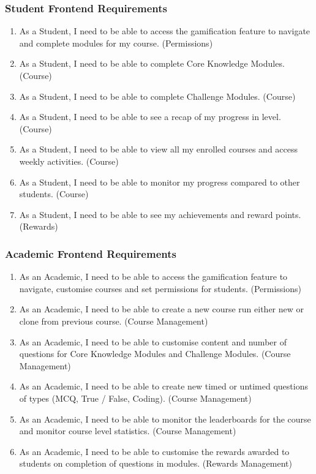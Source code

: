 \subsubsection{Student Frontend Requirements}
\begin{enumerate}
    \item As a Student, I need to be able to access the gamification feature to navigate and complete modules for my course. (Permissions)
    \item As a Student, I need to be able to complete Core Knowledge Modules. (Course)
    \item As a Student, I need to be able to complete Challenge Modules. (Course)
    \item As a Student, I need to be able to see a recap of my progress in level. (Course)
    \item As a Student, I need to be able to view all my enrolled courses and access weekly activities. (Course)
    \item As a Student, I need to be able to monitor my progress compared to other students. (Course)
    \item As a Student, I need to be able to see my achievements and reward points. (Rewards)
\end{enumerate}

\subsubsection{Academic Frontend Requirements}
\begin{enumerate}
    \item As an Academic, I need to be able to access the gamification feature to navigate, customise courses and set permissions for students. (Permissions)
    \item As an Academic, I need to be able to create a new course run either new or clone from previous course. (Course Management)
    \item As an Academic, I need to be able to customise content and number of questions for Core Knowledge Modules and Challenge Modules. (Course Management)
    \item As an Academic, I need to be able to create new timed or untimed questions of types (MCQ, True / False, Coding). (Course Management)
    \item As an Academic, I need to be able to monitor the leaderboards for the course and monitor course level statistics. (Course Management)
    \item As an Academic, I need to be able to customise the rewards awarded to students on completion of questions in modules. (Rewards Management)
\end{enumerate}

